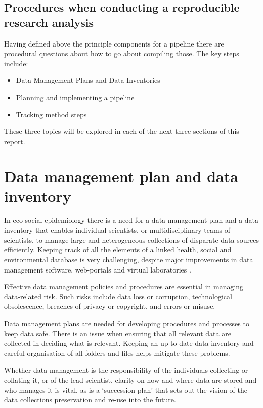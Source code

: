 \documentclass[11pt,a4paper]{article}
\begin{document}
\subsection{Procedures when conducting a reproducible research
analysis}\label{procedures-when-conducting-a-reproducible-research-analysis}

Having defined above the principle components for a pipeline there are
procedural questions about how to go about compiling those. The key
steps include:

\begin{itemize}
\itemsep1pt\parskip0pt
\item  Data Management Plans and Data Inventories
\item  Planning and implementing a pipeline
\item  Tracking method steps
\end{itemize}

These three topics will be explored in each of the next three sections of this report.

\section{Data management plan and data
inventory}\label{data-management-plan-and-data-inventory}

In eco-social epidemiology there is a need for a data management plan
and a data inventory that enables individual scientists, or
multidisciplinary teams of scientists, to manage large and heterogeneous
collections of disparate data sources efficiently. Keeping track of all
the elements of a linked health, social and environmental database is
very challenging, despite major improvements in data management
software, web-portals and virtual laboratories \citep{Fleming2014}.

Effective data management policies and procedures are essential in
managing data-related risk. Such risks include data loss or corruption,
technological obsolescence, breaches of privacy or copyright, and errors
or misuse. 

Data management plans are needed for developing procedures and processes
to keep data safe. There is an issue when ensuring that all relevant
data are collected in deciding what is relevant. Keeping an up-to-date
data inventory and careful organisation of all folders and files helps
mitigate these problems.

Whether data management is the responsibility of the individuals
collecting or collating it, or of the lead scientist, clarity on how and
where data are stored and who manages it is vital, as is a `succession
plan' that sets out the vision of the data collections preservation and
re-use into the future.
\end{document}
